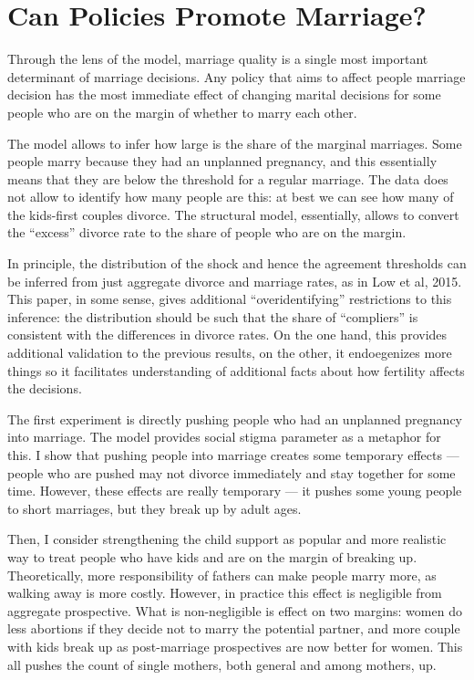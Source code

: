 \documentclass[12pt,letter]{article}
\begin{document}
\section{Can Policies Promote Marriage?}
Through the lens of the model, marriage quality is a single most important determinant of marriage decisions. Any policy that aims to affect people marriage decision has the most immediate effect of changing marital decisions for some people who are on the margin of whether to marry each other.

The model allows to infer how large is the share of the marginal marriages. Some people marry because they had an unplanned pregnancy, and this essentially means that they are below the threshold for a regular marriage. The data does not allow to identify how many people are this: at best we can see how many of the kids-first couples divorce. The structural model, essentially, allows to convert the ``excess'' divorce rate to the share of people who are on the margin. %

In principle, the distribution of the shock and hence the agreement thresholds can be inferred from just aggregate divorce and marriage rates, as in Low et al, 2015. This paper, in some sense, gives additional ``overidentifying'' restrictions to this inference: the distribution should be such that the share of ``compliers'' is consistent with the differences in divorce rates. On the one hand, this provides additional validation to the previous results, on the other, it endoegenizes more things so it facilitates understanding of additional facts about how fertility affects the decisions.

The first experiment is directly pushing people who had an unplanned pregnancy into marriage. The model provides social stigma parameter as a metaphor for this. I show that pushing people into marriage creates some temporary effects --- people who are pushed may not divorce immediately and stay together for some time. However, these effects are really temporary --- it pushes some young people to short marriages, but they break up by adult ages.

Then, I consider strengthening the child support as popular and more realistic way to treat people who have kids and are on the margin of breaking up. Theoretically, more responsibility of fathers can make people marry more, as walking away is more costly. However, in practice this effect is negligible from aggregate prospective. What is non-negligible is effect on two margins: women do less abortions if they decide not to marry the potential partner, and more couple with kids break up as post-marriage prospectives are now better for women. This all pushes the count of single mothers, both general and among mothers, up.
\end{document}
